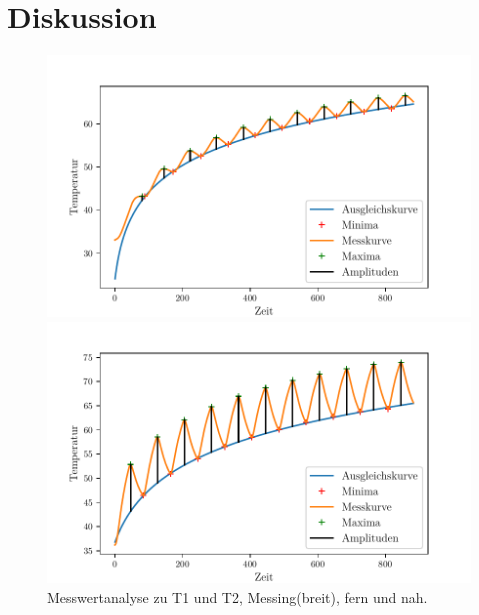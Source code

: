 \section{Diskussion}
\label{sec:Diskussion}
\begin{figure}
    \centering
    \begin{minipage}{.5\textwidth}
        \centering
        \includegraphics[max width=1.1\linewidth]{plots/amplitudes_brass_wide_far(t1).pdf}
        \caption{}
        \label{fig:plot_amps_t1}
    \end{minipage}%
    \begin{minipage}{.5\textwidth}
        \centering
        \includegraphics[max width=1.1\linewidth]{plots/amplitudes_brass_wide_close(t2).pdf}
        \caption{}
        \label{fig:plot_amps_t2}
    \end{minipage}
    \caption{Messwertanalyse zu T1 und T2, Messing(breit), fern und nah.}
    \label{fig:plots_amps_t1_t2}
\end{figure}


